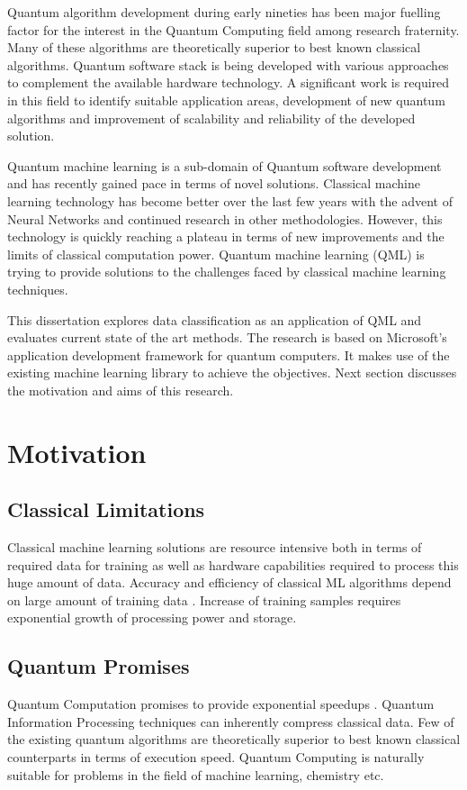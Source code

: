 \documentclass[english,a4paper,11pt,oneside,onecolumn]{book}
\begin{document}
Quantum algorithm development during early nineties has been major fuelling factor for the interest in the Quantum Computing field among research fraternity. Many of these algorithms are theoretically superior to best known classical algorithms. Quantum software stack is being developed with various approaches to complement the available hardware technology. A significant work is required in this field to identify suitable application areas, development of new quantum algorithms and improvement of scalability and reliability of the developed solution.

Quantum machine learning \cite{biamonte_2017_quantum} is a sub-domain of Quantum software development and has recently gained pace in terms of novel solutions. Classical machine learning technology has become better over the last few years with the advent of Neural Networks and continued research in other methodologies. However, this technology is quickly reaching a plateau in terms of new improvements and the limits of classical computation power. Quantum machine learning (QML) is trying to provide solutions to the challenges faced by classical machine learning techniques. 

This dissertation explores data classification as an application of QML and evaluates current state of the art methods. The research is based on Microsoft's application development framework for quantum computers. It makes use of the existing machine learning library to achieve the objectives. Next section discusses the motivation and aims of this research.

\section{Motivation}
\label{sec:resMotiv}

\subsection{Classical Limitations}
Classical machine learning solutions are resource intensive both in terms of required data for training as well as hardware capabilities required to process this huge amount of data. Accuracy and efficiency of classical ML algorithms depend on large amount of training data \cite{voss_2016_why}. Increase of training samples requires exponential growth of processing power and storage.

\subsection{Quantum Promises}
Quantum Computation promises to provide exponential speedups \cite{biamonte_2017_quantum, nielsen_2019_quantum, castelvecchi_2017_quantum}. Quantum Information Processing techniques can inherently compress classical data. Few of the existing quantum algorithms are theoretically superior to best known classical counterparts in terms of execution speed. Quantum Computing is naturally suitable for problems in the field of machine learning, chemistry etc.
  
\end{document}
